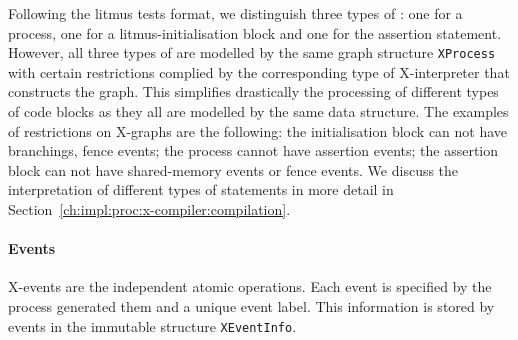 Following the litmus tests format, we distinguish three types of \xgraph{}: one for a process, one for a litmus-initialisation block and one for the assertion statement.
However, all three types of \xgraph{} are modelled by the same graph structure \texttt{XProcess} with certain restrictions complied by the corresponding type of X-interpreter that constructs the graph. %
This simplifies drastically the processing of different types of code blocks as they all are modelled by the same data structure.
The examples of restrictions on X-graphs are the following: the initialisation block can not have branchings, fence events; the process cannot have assertion events; the assertion block can not have shared-memory events or fence events.
We discuss the interpretation of different types of statements in more detail in Section~\ref{ch:impl:proc:x-compiler:compilation}.


\paragraph{Events}
\label{ch:impl:model:xgraph:evt}

X-events are the independent atomic operations.
Each event is specified by the process generated them and a unique event label.
This information is stored by events in the immutable structure \texttt{XEventInfo}.

